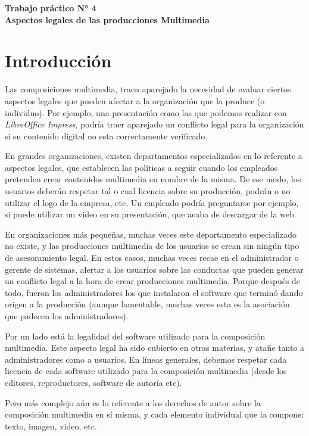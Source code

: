 \documentclass[12pt]{article}
\def\maketitle{

    \makeatletter
    {\color{bl} \centering \huge \sc \textbf{
    Trabajo práctico N° 4\\
    \large \vspace*{-8pt} \color{black} Aspectos legales de las producciones
    Multimedia
    \vspace*{8pt} }\par}
    \makeatother

    \makeatletter
    
}
\begin{document}
\thispagestyle{empty}
\maketitle
\setlength{\parindent}{0pt}

\section*{Introducción}

Las composiciones multimedia, traen aparejado la necesidad de evaluar ciertos
aspectos legales que pueden afectar a la organización que la produce (o
individuo). Por ejemplo, una presentación como las que podemos realizar con
\emph{LibreOffice Impress}, podría traer aparejado un conflicto legal para la
organización si su contenido digital no esta correctamente verificado.

En grandes organizaciones, existen departamentos especializados en lo
referente a aspectos legales, que establecen las políticas a seguir cuando los
empleados pretenden crear contenidos multimedia en nombre de la misma. De ese
modo, los usuarios deberán respetar tal o cual licencia sobre su producción,
podrán o no utilizar el logo de la empresa, etc. Un empleado podría
preguntarse por ejemplo, si puede utilizar un video en su presentación, que
acaba de descargar de la web.

En organizaciones más pequeñas, muchas veces este departamento especializado
no existe, y las producciones multimedia de los usuarios se crean sin ningún
tipo de asesoramiento legal. En estos casos, muchas veces recae en el
administrador o gerente de sistemas, alertar a los usuarios sobre las
conductas que pueden generar un conflicto legal a la hora de crear
producciones multimedia. Porque después de todo, fueron los administradores
los que instalaron el software que terminó dando origen a la producción
(aunque lamentable, muchas veces esta es la asociación que padecen los
administradores).

Por un lado está la legalidad del software utilizado para la composición
multimedia. Este aspecto legal ha sido cubierto en otras materias, y atañe
tanto a administradores como a usuarios. En líneas generales, debemos respetar
cada licencia de cada software utilizado para la composición multimedia (desde
los editores, reproductores, software de autoría etc).

Pero más complejo aún es lo referente a los derechos de autor sobre la
composición multimedia en sí misma, y cada elemento individual que la compone:
texto, imagen, video, etc.
\end{document}
